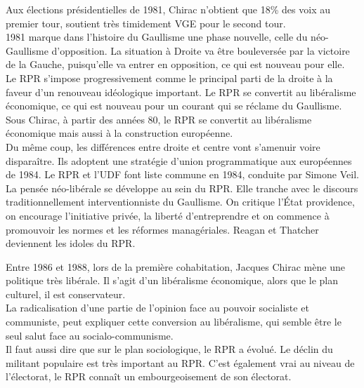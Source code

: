 \documentclass[10pt, a4paper, openany]{book}
\begin{document}
Aux élections présidentielles de 1981, Chirac n'obtient que 18\% des voix au premier tour, soutient très timidement VGE pour le second tour. \\
1981 marque dans l'histoire du Gaullisme une phase nouvelle, celle du néo-Gaullisme d'opposition. La situation à Droite va être bouleversée par la victoire de la Gauche, puisqu'elle va entrer en opposition, ce qui est nouveau pour elle. \\
Le RPR s'impose progressivement comme le principal parti de la droite à la faveur d'un renouveau idéologique important. Le RPR se convertit au libéralisme économique, ce qui est nouveau pour un courant qui se réclame du Gaullisme. Sous Chirac, à partir des années 80, le RPR se convertit au libéralisme économique mais aussi à la construction européenne. \\
Du même coup, les différences entre droite et centre vont s'amenuir voire disparaître. Ils adoptent une stratégie d'union programmatique aux européennes de 1984. Le RPR et l'UDF font liste commune en 1984, conduite par Simone Veil. La pensée néo-libérale se développe au sein du RPR. Elle tranche avec le discours traditionnellement interventionniste du Gaullisme. On critique l'État providence, on encourage l'initiative privée, la liberté d'entreprendre et on commence à promouvoir les normes et les réformes managériales. Reagan et Thatcher deviennent les idoles du RPR. 


Entre 1986 et 1988, lors de la première cohabitation, Jacques Chirac mène une politique très libérale. Il s'agit d'un libéralisme économique, alors que le plan culturel, il est conservateur. \\
La radicalisation d'une partie de l'opinion face au pouvoir socialiste et communiste, peut expliquer cette conversion au libéralisme, qui semble être le seul salut face au socialo-communisme. \\
Il faut aussi dire que sur le plan sociologique, le RPR a évolué. Le déclin du militant populaire est très important au RPR. C'est également vrai au niveau de l'électorat, le RPR connaît un embourgeoisement de son électorat. 
\end{document}
